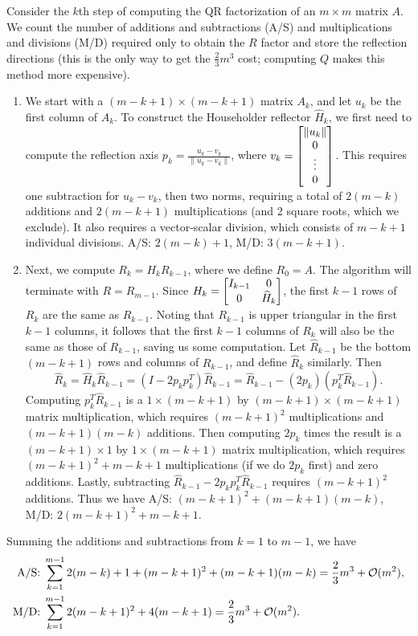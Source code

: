 \documentclass{homework}
\begin{document}
\begin{alphaparts}
		\questionpart Consider the $k$th step of computing the QR factorization of an $m\times m$ matrix $A$. We count the number of additions and subtractions (A/S) and multiplications and divisions (M/D) required only to obtain the $R$ factor and store the reflection directions (this is the only way to get the $\frac{2}{3}m^3$ cost; computing $Q$ makes this method more expensive).
		\begin{enumerate}[label=\arabic*.]
			\item We start with a $(m-k+1)\times(m-k+1)$ matrix $A_k$, and let $u_k$ be the first column of $A_k$. To construct the Householder reflector $\widehat{H}_k$, we first need to compute the reflection axis $p_k = \frac{u_k - v_k}{\lVert u_k - v_k\rVert}$, where $v_k = \left[\begin{matrix}\lVert u_k\rVert \\ 0 \\ \vdots \\ 0\end{matrix}\right]$. This requires one subtraction for $u_k -v_k$, then two norms, requiring a total of $2(m-k)$ additions and $2(m-k+1)$ multiplications (and 2 square roots, which we exclude). It also requires a vector-scalar division, which consists of $m-k+1$ individual divisions. A/S: $2(m-k) + 1$, M/D: $3(m-k+1)$.
			
			\item Next, we compute $R_k = H_kR_{k-1}$, where we define $R_0 = A$. The algorithm will terminate with $R = R_{m-1}$. Since $H_k = \left[\begin{matrix}I_{k-1} & 0 \\ 0 & \widehat{H}_k\end{matrix}\right]$, the first $k-1$ rows of $R_k$ are the same as $R_{k-1}$. Noting that $R_{k-1}$ is upper triangular in the first $k-1$ columns, it follows that the first $k-1$ columns of $R_k$ will also be the same as those of $R_{k-1}$, saving us some computation. Let $\widehat{R}_{k-1}$ be the bottom $(m-k+1)$ rows and columns of $R_{k-1}$, and define $\widehat{R}_k$ similarly. Then 
			\begin{equation*}
				\widehat{R}_k = \widehat{H}_k\widehat{R}_{k-1} = (I-2p_kp_k^T)\widehat{R}_{k-1} = \widehat{R}_{k-1} - (2p_k)(p_k^T\widehat{R}_{k-1}).
			\end{equation*}
			Computing $p_k^T\widehat{R}_{k-1}$ is a $1\times (m-k+1)$ by $(m-k+1)\times (m-k+1)$ matrix multiplication, which requires $(m-k+1)^2$ multiplications and $(m-k+1)(m-k)$ additions. Then computing $2p_k$ times the result is a $(m-k+1)\times 1$ by $1\times(m-k+1)$ matrix multiplication, which requires $(m-k+1)^2 + m-k+1$ multiplications (if we do $2p_k$ first) and zero additions. Lastly, subtracting $\widehat{R}_{k-1} - 2p_kp_k^T\widehat{R}_{k-1}$ requires $(m-k+1)^2$ additions. Thus we have A/S: ${(m-k+1)^2 +(m-k+1)(m-k)}$, M/D: $2(m-k+1)^2 + m-k+1$.
		\end{enumerate}
		
		Summing the additions and subtractions from $k=1$ to $m-1$, we have
		\begin{align*}
			\text{A/S:}&\; \sum_{k=1}^{m-1}2(m-k)+1+(m-k+1)^2+(m-k+1)(m-k)= \frac{2}{3}m^3 + \mathcal{O}(m^2), \\
			\text{M/D:}&\;\sum_{k=1}^{m-1} 2(m-k+1)^2 + 4(m-k+1) = \frac{2}{3}m^3 + \mathcal{O}(m^2).
		\end{align*}
	\end{alphaparts}
	
\end{document}
